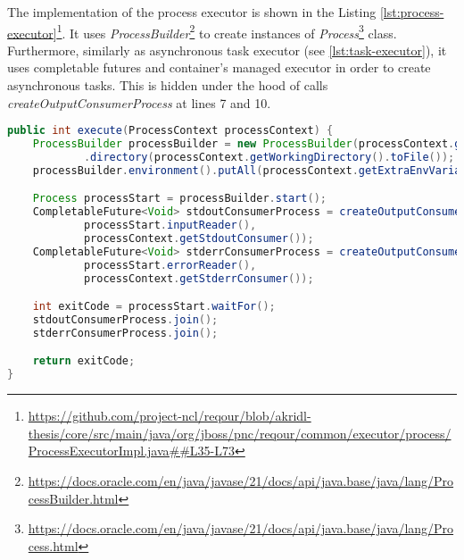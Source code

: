 \documentclass[../main.tex]{subfiles}
\begin{document}
The implementation of the process executor is shown in the Listing \ref{lst:process-executor}\footnote{\url{https://github.com/project-ncl/reqour/blob/akridl-thesis/core/src/main/java/org/jboss/pnc/reqour/common/executor/process/ProcessExecutorImpl.java##L35-L73}}. It uses \textit{ProcessBuilder}\footnote{\url{https://docs.oracle.com/en/java/javase/21/docs/api/java.base/java/lang/ProcessBuilder.html}} to create instances of \textit{Process}\footnote{\url{https://docs.oracle.com/en/java/javase/21/docs/api/java.base/java/lang/Process.html}} class. Furthermore, similarly as asynchronous task executor (see \ref{lst:task-executor}), it uses completable futures and container's managed executor in order to create asynchronous tasks. This is hidden under the hood of calls \textit{createOutputConsumerProcess} at lines 7 and 10.

\begin{lstlisting}[language=Java, caption=Process executor implementation, label={lst:process-executor}]
public int execute(ProcessContext processContext) {
    ProcessBuilder processBuilder = new ProcessBuilder(processContext.getCommand())
            .directory(processContext.getWorkingDirectory().toFile());
    processBuilder.environment().putAll(processContext.getExtraEnvVariables());

    Process processStart = processBuilder.start();
    CompletableFuture<Void> stdoutConsumerProcess = createOutputConsumerProcess(
            processStart.inputReader(),
            processContext.getStdoutConsumer());
    CompletableFuture<Void> stderrConsumerProcess = createOutputConsumerProcess(
            processStart.errorReader(),
            processContext.getStderrConsumer());

    int exitCode = processStart.waitFor();
    stdoutConsumerProcess.join();
    stderrConsumerProcess.join();

    return exitCode;
}
\end{lstlisting}
\end{document}
